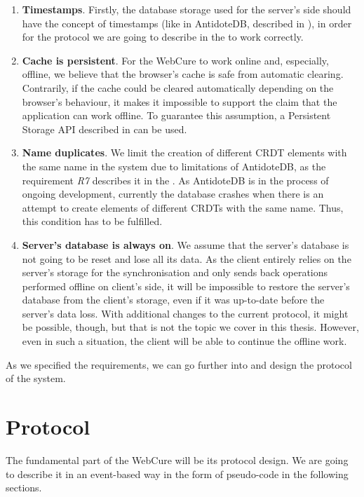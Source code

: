 \begin{enumerate}
\item {\textbf{Timestamps}. Firstly, the database storage used for the server's side should have the concept of timestamps (like in AntidoteDB, described in ), in order for the protocol we are going to describe in the  to work correctly.}
\item {\textbf{Cache is persistent}. For the WebCure to work online and, especially, offline, we believe that the browser's cache is safe from automatic clearing. Contrarily, if the cache could be cleared automatically depending on the browser's behaviour, it makes it impossible to support the claim that the application can work offline. To guarantee this assumption, a Persistent Storage API described in  can be used.}
\item{\textbf{Name duplicates}. We limit the creation of different CRDT elements with the same name in the system due to limitations of AntidoteDB, as the requirement \textit{R7} describes it in the . As AntidoteDB is in the process of ongoing development, currently the database crashes when there is an attempt to create elements of different CRDTs with the same name. Thus, this condition has to be fulfilled.}
\item{\textbf{Server's database is always on}. We assume that the server's database is not going to be reset and lose all its data. As the client entirely relies on the server's storage for the synchronisation and only sends back operations performed offline on client's side, it will be impossible to restore the server's database from the client's storage, even if it was up-to-date before the server's data loss. With additional changes to the current protocol, it might be possible, though, but that is not the topic we cover in this thesis. However, even in such a situation, the client will be able to continue the offline work.}
\end{enumerate}

As we specified the requirements, we can go further into and design the protocol of the system.

\section{Protocol}
\label{4-protocol}

The fundamental part of the WebCure will be its protocol design. We are going to describe it in an event-based way in the form of pseudo-code in the following sections. 

